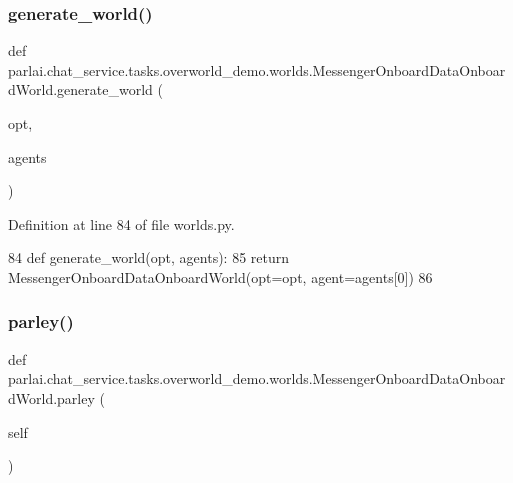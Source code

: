 \subsubsection{\texorpdfstring{generate\+\_\+world()}{generate\_world()}}
{\footnotesize\ttfamily def parlai.\+chat\+\_\+service.\+tasks.\+overworld\+\_\+demo.\+worlds.\+Messenger\+Onboard\+Data\+Onboard\+World.\+generate\+\_\+world (\begin{DoxyParamCaption}\item[{}]{opt,  }\item[{}]{agents }\end{DoxyParamCaption})\hspace{0.3cm}{\ttfamily [static]}}



Definition at line 84 of file worlds.\+py.


\begin{DoxyCode}
84     \textcolor{keyword}{def }generate\_world(opt, agents):
85         \textcolor{keywordflow}{return} MessengerOnboardDataOnboardWorld(opt=opt, agent=agents[0])
86 
\end{DoxyCode}
\mbox{\label{classparlai_1_1chat__service_1_1tasks_1_1overworld__demo_1_1worlds_1_1MessengerOnboardDataOnboardWorld_a90c95055c19bb99fdf3d5b0ca033b282}} 
\subsubsection{\texorpdfstring{parley()}{parley()}}
{\footnotesize\ttfamily def parlai.\+chat\+\_\+service.\+tasks.\+overworld\+\_\+demo.\+worlds.\+Messenger\+Onboard\+Data\+Onboard\+World.\+parley (\begin{DoxyParamCaption}\item[{}]{self }\end{DoxyParamCaption})}



